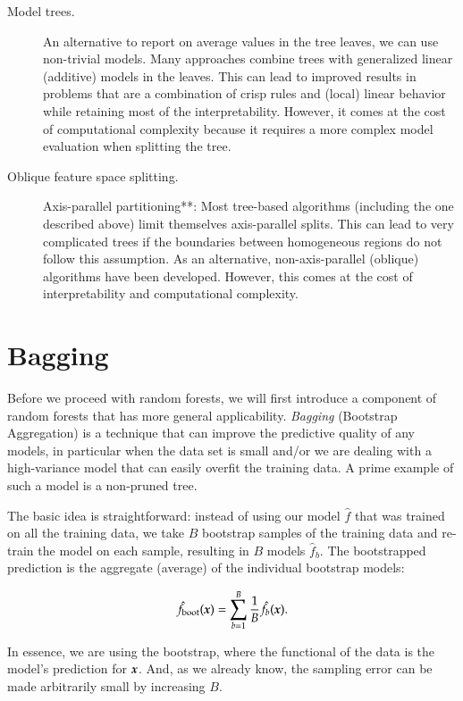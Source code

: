 \begin{refsection}
\begin{description}
\item[Model trees.] An alternative to report on average values in the tree leaves, we can use non-trivial models. Many approaches combine trees with generalized linear (additive) models in the leaves. This can lead to improved results in problems that are a combination of crisp rules and (local) linear behavior while retaining most of the interpretability. However, it comes at the cost of computational complexity because it requires a more complex model evaluation when splitting the tree.

\item[Oblique feature space splitting.] Axis-parallel partitioning**: Most tree-based algorithms (including the one described above) limit themselves axis-parallel splits. This can lead to very complicated trees if the boundaries between homogeneous regions do not follow this assumption. As an alternative, non-axis-parallel (oblique) algorithms have been developed. However, this comes at the cost of interpretability and computational complexity.
\end{description}

\section{Bagging}

Before we proceed with random forests, we will first introduce a component of random forests that has more general applicability. {\em Bagging} (Bootstrap Aggregation) is a technique that can improve the predictive quality of any models, in particular when the data set is small and/or we are dealing with a high-variance model that can easily overfit the training data. A prime example of such a model is a non-pruned tree.

The basic idea is straightforward: instead of using our model $\hat{f}$ that was trained on all the training data, we take $B$ bootstrap samples of the training data and re-train the model on each sample, resulting in $B$ models $\hat{f}_b$. The bootstrapped prediction is the aggregate (average) of the individual bootstrap models:

$$\hat{f}_{\text{boot}}(\boldsymbol{x}) = \sum_{b=1}^B {1\over B} \hat{f}_b(\boldsymbol{x}).$$

In essence, we are using the bootstrap, where the functional of the data is the model's prediction for $\boldsymbol{x}$. And, as we already know, the sampling error can be made arbitrarily small by increasing $B$.


\end{refsection}
